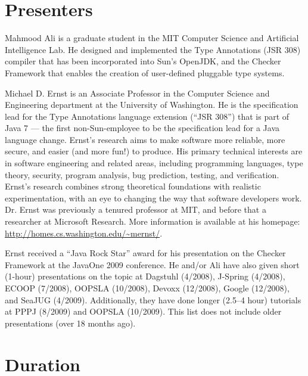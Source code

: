 \documentclass{sig-alternate} %
\begin{document}
% 
% 

\section{Presenters}

Mahmood Ali is a graduate student in the MIT Computer Science and
Artificial Intelligence Lab.  He designed and implemented the Type
Annotations (JSR 308) compiler that has been incorporated into Sun's
OpenJDK, and the Checker Framework that enables the creation of
user-defined pluggable type systems.

Michael D. Ernst is an Associate Professor in the Computer Science and
Engineering department at the University of Washington.  He is the
specification lead for the Type Annotations language extension (``JSR
308'') that is part of Java 7 --- the first non-Sun-employee to be the
specification lead for a Java language change.  Ernst's research aims to
make software more reliable, more secure, and easier (and more fun!) to
produce. His primary technical interests are in software engineering and
related areas, including programming languages, type theory, security,
program analysis, bug prediction, testing, and verification. Ernst's
research combines strong theoretical foundations with realistic
experimentation, with an eye to changing the way that software developers
work.  Dr. Ernst was previously a tenured professor at MIT, and before that
a researcher at Microsoft Research.  More information is available at his
homepage:  \url{http://homes.cs.washington.edu/~mernst/}.

Ernst received a ``Java Rock Star'' award for his presentation on the
Checker Framework at the JavaOne 2009 conference.  He and/or Ali have also
given short (1-hour) presentations on the topic at Dagstuhl (4/2008),
J-Spring (4/2008), ECOOP (7/2008), OOPSLA (10/2008), Devoxx (12/2008),
Google (12/2008), and SeaJUG (4/2009).  Additionally, they have done longer
(2.5--4 hour) tutorials at PPPJ (8/2009) and OOPSLA (10/2009).  This list
does not include older presentations (over 18 months ago).


\section{Duration}
\end{document}
